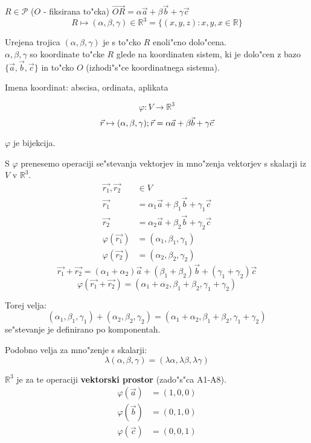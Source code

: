 \(R \in \mathcal{P}\) (\(O\) - fiksirana to"cka)
\(\vec{OR} = \alpha \vec{a} + \beta \vec{b} + \gamma \vec{c}\)
\[R \mapsto (\alpha, \beta, \gamma) \in \mathbb{R}^3 = \{(x, y, z): x, y, x \in \mathbb{R}\}\]

Urejena trojica \((\alpha, \beta, \gamma)\) je s to"cko \(R\) enoli"cno dolo"cena.\\
\(\alpha, \beta, \gamma\) so koordinate to"cke \(R\) glede na koordinaten sistem, ki je dolo"cen z bazo \(\{\vec{a}, \vec{b}, \vec{c}\}\) in to"cko \(O\) (izhodi"s"ce koordinatnega sistema).

Imena koordinat: abscisa, ordinata, aplikata

\[\varphi: V \rightarrow \mathbb{R}^3\]
\[\vec{r} \mapsto (\alpha, \beta, \gamma); \vec{r} = \alpha \vec{a} + \beta \vec{b} + \gamma \vec{c}\]

\(\varphi\) je bijekcija.

S \(\varphi\) prenesemo operaciji se"stevanja vektorjev in mno"zenja vektorjev s skalarji iz \(V\) v \(\mathbb{R}^3\).
\begin{align*}
	\vec{r_1}, \vec{r_2} &\in V\\
	\vec{r_1} &= \alpha_1 \vec{a} + \beta_1 \vec{b} + \gamma_1 \vec{c}\\
	\vec{r_2} &= \alpha_2 \vec{a} + \beta_2 \vec{b} + \gamma_2 \vec{c}\\
	\varphi(\vec{r_1}) &= (\alpha_1, \beta_1, \gamma_1)\\
	\varphi(\vec{r_2}) &= (\alpha_2, \beta_2, \gamma_2)
\end{align*}
\[\vec{r_1} + \vec{r_2} = (\alpha_1 + \alpha_2) \vec{a} + (\beta_1 + \beta_2)\vec{b} + (\gamma_1 + \gamma_2)\vec{c}\]
\[\varphi(\vec{r_1} + \vec{r_2}) = (\alpha_1 + \alpha_2, \beta_1 + \beta_2, \gamma_1 + \gamma_2)\]

Torej velja:
\[(\alpha_1, \beta_1, \gamma_1) + (\alpha_2, \beta_2, \gamma_2) = (\alpha_1 + \alpha_2, \beta_1 + \beta_2, \gamma_1 + \gamma_2)\]
se"stevanje je definirano po komponentah.

Podobno velja za mno"zenje s skalarji:
\[\lambda(\alpha, \beta, \gamma) = (\lambda \alpha, \lambda \beta, \lambda \gamma)\]

\(\mathbb{R}^3\) je za te operaciji \textbf{vektorski prostor} (zado"s"ca A1-A8).
\begin{align*}
	\varphi(\vec{a}) &= (1, 0, 0)\\
	\varphi(\vec{b}) &= (0, 1, 0)\\
	\varphi(\vec{c}) &= (0, 0, 1)
\end{align*}

